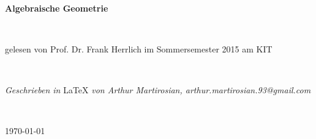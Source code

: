 \documentclass[11pt]{book}
\theoremstyle{nonumberbreak}
\begin{document}
\begin{titlepage}

\textrm{ }\\[64pt]

\begin{center}
{\fontsize{40}{40} \selectfont \textbf{Algebraische Geometrie}}
\end{center}
\textrm{ } \\[36pt]
\begin{center} \large{\textrm{gelesen von Prof. Dr. Frank Herrlich im Sommersemester 2015 am KIT}} \end{center}
\textrm{ } \\[320pt]
\begin{center} \large{\textit{Geschrieben in } \LaTeX \textit{ von Arthur Martirosian, arthur.martirosian.93@gmail.com}}\end{center}
\textrm{ }\\[24pt]
\begin{center} \large{\today} \end{center}

\end{titlepage}
\thispagestyle{empty}



\begin{spacing}{1.62}
\setcounter{tocdepth}{1}
\tableofcontents
\thispagestyle{empty}
\end{spacing}
\newpage
\end{document}
